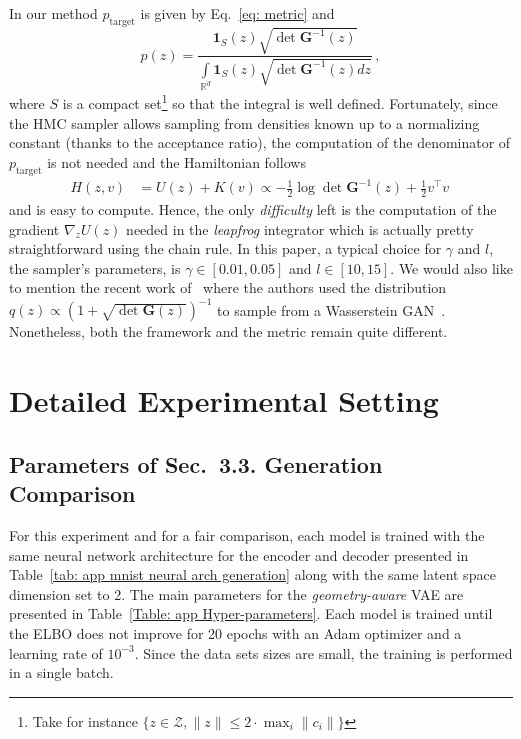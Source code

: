 \documentclass[10pt,journal,compsoc]{IEEEtran}
\begin{document}
  In our method $p_{\mathrm{target}}$ is given by Eq.~\eqref{eq: metric} and 
   \begin{equation}\label{Eq: app Target distribution}
    p(z) = \frac{\mathbf{1}_S(z) \sqrt{\det \mathbf{G}^{-1}(z)}}{\int \limits _{\mathbb{R}^d} \mathbf{1}_S(z) \sqrt{\det \mathbf{G}^{-1}(z) dz}}\,,
    \end{equation}
    where $S$ is a compact set\footnote{Take for instance $\{z \in \mathcal{Z}, \lVert z \rVert \leq 2 \cdot \max_i \lVert c_i \rVert \}$} so that the integral is well defined. Fortunately, since the HMC sampler allows sampling from densities known up to a normalizing constant (thanks to the acceptance ratio), the computation of the denominator of $p_{\mathrm{target}}$ is not needed and the Hamiltonian follows
  \[\begin{aligned}
    H(z, v) &= U(z) + K(v) \propto -\frac{1}{2} \log \det \mathbf{G}^{-1}(z) + \frac{1}{2} v^{\top} v \,
  \end{aligned}
  \]
  and is easy to compute. Hence, the only \emph{difficulty} left is the computation of the gradient $\nabla_z U(z)$ needed in the \emph{leapfrog} integrator which is actually pretty straightforward using the chain rule.
  In this paper, a typical choice for $\gamma$ and $l$, the sampler's parameters, is $\gamma \in [0.01, 0.05]$ and $l\in[10, 15]$. We would also like to mention the recent work of~\cite{arvanitidis_geometrically_2020} where the authors used the distribution $q(z) \propto (1 + \sqrt{\det \mathbf{G}(z)})^{-1}$ to sample from a Wasserstein GAN~\cite{arjovsky_wasserstein_2017}. Nonetheless, both the framework and the metric remain quite different.
 


\section{Detailed Experimental Setting}\label{appendix D}

\subsection{Parameters of Sec.~3.3. Generation Comparison}\label{appendix D.1}
For this experiment and for a fair comparison, each model is trained with the same neural network architecture for the encoder and decoder presented in Table~\ref{tab: app mnist neural arch generation} along with the same latent space dimension set to 2. The main parameters for the \emph{geometry-aware} VAE are presented in Table~\ref{Table: app Hyper-parameters}. Each model is trained until the ELBO does not improve for 20 epochs with an Adam optimizer \cite{kingma_adam_2014} and a learning rate of $10^{-3}$. Since the data sets sizes are small, the training is performed in a single batch.
\end{document}
